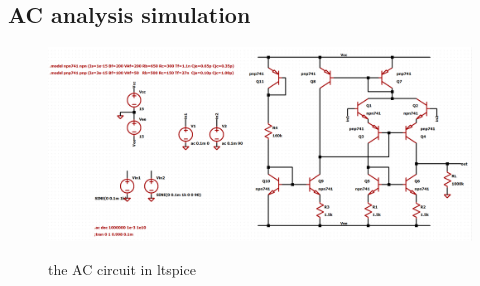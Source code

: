 \documentclass[11pt]{article}
\begin{document}
\subsection{AC analysis simulation}
\begin{figure}[H]
    \begin{center}
        \includegraphics[scale=0.4]{Fig/ac-circuit.png}
        \label{fig:ACCircuit}
        \caption{the AC circuit in ltspice}
    \end{center}
\end{figure}
\end{document}
